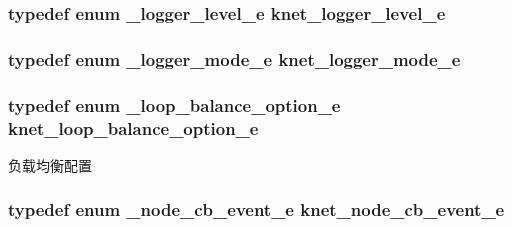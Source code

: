 \subsubsection[{knet\+\_\+logger\+\_\+level\+\_\+e}]{\setlength{\rightskip}{0pt plus 5cm}typedef enum {\bf \+\_\+logger\+\_\+level\+\_\+e}  {\bf knet\+\_\+logger\+\_\+level\+\_\+e}}\label{a00066_a8bb61ec2ff976625d0707a81c1ccc149_a8bb61ec2ff976625d0707a81c1ccc149}
\hypertarget{a00066_a3ad8e017e53143bca2ada78d2bfa30e1_a3ad8e017e53143bca2ada78d2bfa30e1}{}
\subsubsection[{knet\+\_\+logger\+\_\+mode\+\_\+e}]{\setlength{\rightskip}{0pt plus 5cm}typedef enum {\bf \+\_\+logger\+\_\+mode\+\_\+e}  {\bf knet\+\_\+logger\+\_\+mode\+\_\+e}}\label{a00066_a3ad8e017e53143bca2ada78d2bfa30e1_a3ad8e017e53143bca2ada78d2bfa30e1}
\hypertarget{a00066_aa131da8fb72468b39b6ee0e2d46b17b2_aa131da8fb72468b39b6ee0e2d46b17b2}{}
\subsubsection[{knet\+\_\+loop\+\_\+balance\+\_\+option\+\_\+e}]{\setlength{\rightskip}{0pt plus 5cm}typedef enum {\bf \+\_\+loop\+\_\+balance\+\_\+option\+\_\+e}  {\bf knet\+\_\+loop\+\_\+balance\+\_\+option\+\_\+e}}\label{a00066_aa131da8fb72468b39b6ee0e2d46b17b2_aa131da8fb72468b39b6ee0e2d46b17b2}
负载均衡配置 \hypertarget{a00066_a7aebece745b529163834cdbd7ab3ac3f_a7aebece745b529163834cdbd7ab3ac3f}{}
\subsubsection[{knet\+\_\+node\+\_\+cb\+\_\+event\+\_\+e}]{\setlength{\rightskip}{0pt plus 5cm}typedef enum {\bf \+\_\+node\+\_\+cb\+\_\+event\+\_\+e}  {\bf knet\+\_\+node\+\_\+cb\+\_\+event\+\_\+e}}\label{a00066_a7aebece745b529163834cdbd7ab3ac3f_a7aebece745b529163834cdbd7ab3ac3f}
\hypertarget{a00066_a09c2d1f8eef7dc82226691ce39b7c4d8_a09c2d1f8eef7dc82226691ce39b7c4d8}{}
